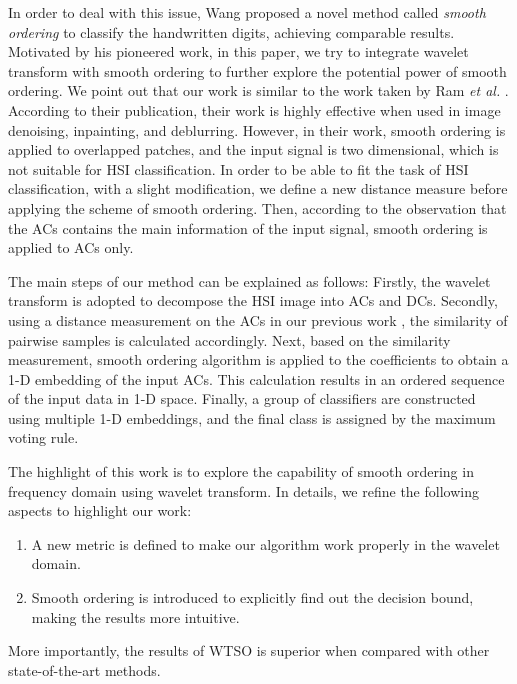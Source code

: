 \documentclass{ws-ijwmip}
\begin{document}
In order to deal with this issue, Wang \cite{34} proposed a novel method called \emph{smooth ordering} to classify the handwritten digits, achieving comparable results.
Motivated by his pioneered work, in this paper, we try to integrate wavelet transform with smooth ordering to further explore the potential power of smooth ordering.
We point out that our work is similar to the work taken by Ram {\it et al.} \cite{30}. 
According to their publication, their work is highly effective when used in image denoising, inpainting, and deblurring. However, in their work, smooth ordering is applied to overlapped patches, and the input signal is two dimensional, which is not suitable for HSI classification. In order to be able to fit the task of HSI classification, with a slight modification, 
we define a new distance measure before applying the scheme of smooth ordering. 
Then, according to the observation that the ACs contains the main information of the input signal, smooth ordering is applied to ACs only. 


The main steps of our method can be explained as follows:
Firstly, the wavelet transform is adopted to decompose the HSI image into ACs and DCs.
Secondly, using a distance measurement on the ACs in our previous work \cite{31},
the similarity of pairwise samples is calculated accordingly.
Next, based on the similarity measurement, smooth ordering algorithm is applied to the coefficients to obtain a 1-D embedding of the input ACs.
This calculation results in an ordered sequence of the input data in 1-D space.
Finally, a group of classifiers are constructed using multiple 1-D embeddings,
and the final class is assigned by the maximum voting rule.



The highlight of this work is to explore the capability of smooth ordering in frequency domain using wavelet transform. In details, we refine the following aspects to highlight our  work: 
\begin{enumerate}
\item A new metric is defined to make our algorithm work properly in the wavelet domain. 
\item Smooth ordering is introduced to explicitly find out the decision bound, making the results more intuitive. 
\end{enumerate}
More importantly, the results of WTSO is superior when compared with other state-of-the-art methods.
\end{document}
